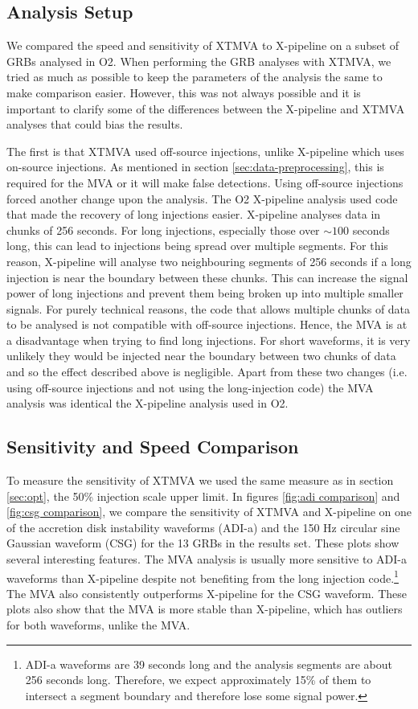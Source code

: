 \documentclass[11pt]{cuthesis}
\newcommand{\xp}{X-pipeline }
\newcommand{\xpc}{X-pipeline, }
\begin{document}
\subsection{Analysis Setup}
We compared the speed and sensitivity of XTMVA to \xp on a subset of GRBs analysed in O2. When performing the GRB analyses with XTMVA, we tried as much as possible to keep the parameters of the analysis the same to make comparison easier. However, this was not always possible and it is important to clarify some of the differences between the \xp and XTMVA analyses that could bias the results. 

The first is that XTMVA used off-source injections, unlike \xp which uses on-source injections. As mentioned in section \ref{sec:data-preprocessing}, this is required for the MVA or it will make false detections. Using off-source injections forced another change upon the analysis. The O2 \xp analysis used code that made the recovery of long injections easier. \xp analyses data in chunks of 256 seconds. For long injections, especially those over $\sim100$ seconds long, this can lead to injections being spread over multiple segments. For this reason, \xp will analyse two neighbouring segments of 256 seconds if a long injection is near the boundary between these chunks. This can increase the signal power of long injections and prevent them being broken up into multiple smaller signals. For purely technical reasons, the code that allows multiple chunks of data to be analysed is not compatible with off-source injections. Hence, the MVA is at a disadvantage when trying to find long injections. For short waveforms, it is very unlikely they would be injected near the boundary between two chunks of data and so the effect described above is negligible. Apart from these two changes (i.e. using off-source injections and not using the long-injection code) the MVA analysis was identical the \xp analysis used in O2. 

\subsection{Sensitivity and Speed Comparison}
To measure the sensitivity of XTMVA we used the same measure as in section \ref{sec:opt}, the 50\% injection scale upper limit. In figures \ref{fig:adi comparison} and \ref{fig:csg comparison}, we compare the sensitivity of XTMVA and \xp on one of the accretion disk instability waveforms (ADI-a) and the 150 Hz circular sine Gaussian waveform (CSG) for the 13 GRBs in the results set. These plots show several interesting features. The MVA analysis is usually more sensitive to ADI-a waveforms than \xp despite not benefiting from the long injection code.\footnote{ADI-a waveforms are 39 seconds long and the analysis segments are about 256 seconds long. Therefore, we expect approximately 15\% of them to intersect a segment boundary and therefore lose some signal power.} The MVA also consistently outperforms \xp for the CSG waveform. These plots also show that the MVA is more stable than \xpc which has outliers for both waveforms, unlike the MVA.
\end{document}

